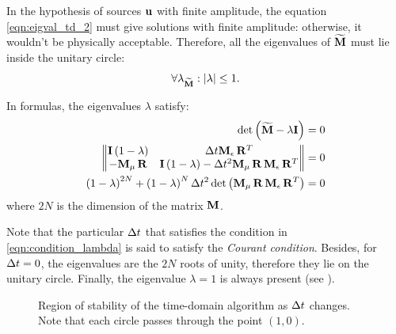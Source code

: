 In the hypothesis of sources $\mathbf{u}$ with finite amplitude, the
equation \eqref{eqn:eigval_td_2} must give solutions with finite
amplitude: otherwise, it wouldn't be physically acceptable. Therefore,
all the eigenvalues of $\widetilde{\mathbf{M}}$ must lie inside the unitary
circle:
\begin{equation} \label{eqn:condition_lambda}
  \forall \lambda_{\widetilde{\mathbf{M}}}: {\left\lvert\lambda\right\rvert} \leq 1.
\end{equation}

In formulas, the eigenvalues $\lambda$ satisfy:
\begin{equation*} \begin{split}
    \det \left( \widetilde{\mathbf{M}} - \lambda \mathbf{I} \right) & = 0 \\
    \begin{Vmatrix} \mathbf{I}
      \left( 1-\lambda \right) & \Delta t
    {\mathbf{M}_\epsilon\,{\mathbf{R}}^T} \\
    -{\mathbf{M}_\mu\,\mathbf{R}} &
    \mathbf{I} \left( 1-\lambda \right) - \Delta t^2 {{{\mathbf{M}_\mu\,\mathbf{R}}\,\mathbf{M}_\epsilon}\,{\mathbf{R}}^T}
    \end{Vmatrix} & = 0 \\
    \left(1 - \lambda\right)^{2N} + \left( 1 - \lambda \right)^N \Delta t^2
    \det\left({{{\mathbf{M}_\mu\,\mathbf{R}}\,\mathbf{M}_\epsilon}\,{\mathbf{R}}^T}\right)
    & = 0
\end{split} \end{equation*}
where $2N$ is the dimension of the matrix $\mathbf{M}$.

Note that the particular $\Delta t$ that satisfies the condition in
\eqref{eqn:condition_lambda} is said to satisfy the \emph{Courant
condition}. Besides, for $\Delta t = 0$, the eigenvalues are the $2N$
roots of unity, therefore they lie on the unitary circle. Finally, the
eigenvalue $\lambda = 1$ is always present (see
).

\begin{figure}[htbp]
  \begin{center}
    \resizebox{8cm}{!}{}
  \end{center}
  \caption{Region of stability of the time-domain algorithm as
    $\Delta t$ changes. Note that each circle passes through the point
    $(1,0)$.}
  \label{fig:stability_td}
\end{figure}


